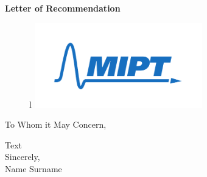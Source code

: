 \documentclass{letter}
\date{}
\begin{document}
\begin{letter}
{
\centering \Large \textbf{Letter of Recommendation}
}

\hfill
\begin{figure}[1]{l}%
    \centering
    \includegraphics[width=0.65\textwidth]{eng.pdf}
\end{figure}

\opening{To Whom it May Concern,} %
\medskip 
Text
\bigskip \\
Sincerely, \\
Name Surname \\

\end{letter}
\end{document}
